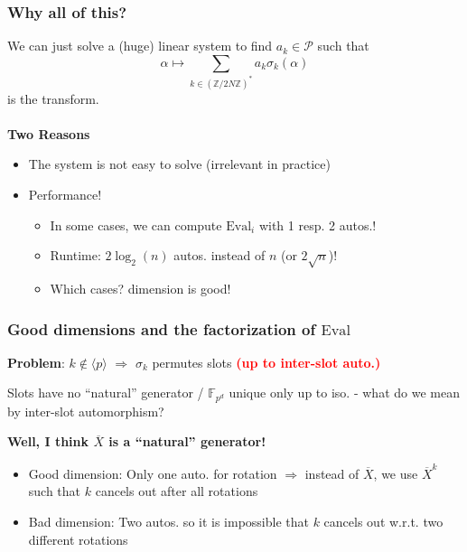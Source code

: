 \documentclass{beamer}
\newcommand{\Z}{\mathbb{Z}}
\newcommand{\F}{\mathbb{F}}
\begin{document}
\begin{frame}
    \frametitle{Why all of this?}

    We can just solve a (huge) linear system to find $a_k \in \mathcal{P}$ such that
    \begin{equation*}
        \alpha \mapsto \sum_{k \in (\Z/2N\Z)^*} a_k \sigma_k(\alpha)
    \end{equation*}
    is the transform.
    \\~\\
    \textbf{Two Reasons}
    \begin{itemize}
        \item The system is not easy to solve (irrelevant in practice)
        \item Performance!
        \begin{itemize}
            \item In some cases, we can compute $\mathrm{Eval}_i$ with 1 resp. 2 autos.!
            \item Runtime: $2\log_2(n)$ autos. instead of $n$ (or $2\sqrt{n}$)!
            \item Which cases? dimension is good!
        \end{itemize}
    \end{itemize}
\end{frame}

\begin{frame}
    \frametitle{Good dimensions and the factorization of $\mathrm{Eval}$}

    \textbf{Problem}: $k \notin \langle p \rangle$ $\Rightarrow$ $\sigma_k$ permutes slots \textcolor{red}{\textbf{(up to inter-slot auto.)}}
    \begin{center}
        Slots have no ``natural'' generator / $\F_{p^d}$ unique only up to iso. - what do we mean by inter-slot automorphism?
    \end{center}
    \textbf{Well, I think $\overline{X}$ is a ``natural'' generator!}
    \begin{itemize}
        \item Good dimension: Only one auto. for rotation $\Rightarrow$ instead of $\overline{X}$, we use $\overline{X}^k$ such that $k$ cancels out after all rotations
        \item Bad dimension: Two autos. so it is impossible that $k$ cancels out w.r.t. two different rotations
    \end{itemize}
\end{frame}
\end{document}
